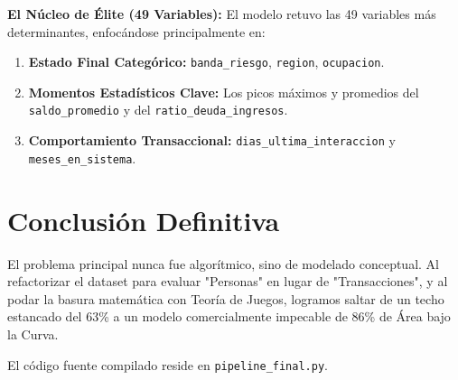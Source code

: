 \documentclass[a4paper,11pt]{article}
\begin{document}
\textbf{El Núcleo de Élite (49 Variables):}
El modelo retuvo las 49 variables más determinantes, enfocándose principalmente en:
\begin{enumerate}
    \item \textbf{Estado Final Categórico:} \texttt{banda\_riesgo}, \texttt{region}, \texttt{ocupacion}.
    \item \textbf{Momentos Estadísticos Clave:} Los picos máximos y promedios del \texttt{saldo\_promedio} y del \texttt{ratio\_deuda\_ingresos}.
    \item \textbf{Comportamiento Transaccional:} \texttt{dias\_ultima\_interaccion} y \texttt{meses\_en\_sistema}.
\end{enumerate}

\section{Conclusión Definitiva}
El problema principal nunca fue algorítmico, sino de modelado conceptual. Al refactorizar el dataset para evaluar "Personas" en lugar de "Transacciones", y al podar la basura matemática con Teoría de Juegos, logramos saltar de un techo estancado del 63\% a un modelo comercialmente impecable de 86\% de Área bajo la Curva.

El código fuente compilado reside en \texttt{pipeline\_final.py}.
\end{document}

